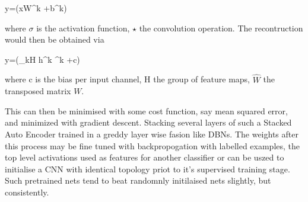 \be
y=\sigma(x\star W^k +b^k)
\ee

where $\sigma$ is the activation function, $\star$ the convolution operation.
The recontruction would then be obtained via

\be
y=\sigma(\sum_{k\epsilon H} h^k \star {}^k +c)
\ee

where c is the bias per input channel, H the group of feature maps, $\hat{W}$ the transposed matrix $W$.

This can then be minimised with some cost function, say mean squared error, and minimized with gradient descent.
Stacking several layers of such a Stacked Auto Encoder trained in a greddy layer wise fasion like DBNs.
The weights after this process may be fine tuned with backpropogation with labelled examples, the top level activations used as features for another classifier or can be uszed to initialise a CNN with identical topology priot to it's supervised training stage\citep{masci2011stacked}.
Such pretrained nets tend to beat randomnly initilaised nets slightly, but consistently\citep{masci2011stacked}.



